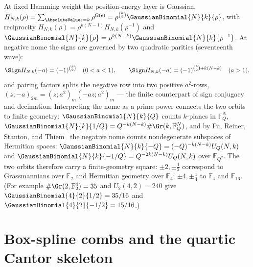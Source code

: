 \documentclass[11pt,oneside]{article}
\numberwithin{equation}{section}
\theoremstyle{definition}
\theoremstyle{remark}
\begin{document}
At fixed Hamming weight the position-energy layer is Gaussian,
$H_{N,k}(\rho)=\sum_{\AbsoluteValue\epsilon=k}\rho^{\Omega(\epsilon)}
=\rho^{\binom k2}\GaussianBinomial{N}{k}{\rho}$, with reciprocity
$H_{N,k}(\rho)=\rho^{k(N-1)}H_{N,k}(\rho^{-1})$ and
$\GaussianBinomial{N}{k}{\rho}=\rho^{k(N-k)}\GaussianBinomial{N}{k}{\rho^{-1}}$.  At negative nome the
signs are governed by two quadratic parities (seventeenth wave):
\begin{equation}\label{p7:eq:H-signs}
 \Sign H_{N,k}(-a)=(-1)^{\binom k2}
 \quad(0<a<1),
 \qquad
 \Sign H_{N,k}(-a)=(-1)^{\binom k2+k(N-k)}
 \quad(a>1),
\end{equation}
and pairing factors splits the negative row into two positive $a^2$-rows,
$(z;-a)_{2m}=(z;a^2)_m(-az;a^2)_m$ --- the finite counterpart of sign
conjugacy and decimation.  Interpreting the nome as a prime power connects
the two orbits to finite geometry: $\GaussianBinomial{N}{k}{Q}$ counts $k$-planes in
$\mathbb F_Q^N$, $\GaussianBinomial{N}{k}{1/Q}=Q^{-k(N-k)}\#\Gr(k,\mathbb F_Q^N)$, and by
Fu, Reiner, Stanton, and Thiem~\cite{p7:fu-reiner-stanton-thiem} the negative
nome counts nondegenerate subspaces of Hermitian spaces:
$\GaussianBinomial{N}{k}{-Q}=(-Q)^{-k(N-k)}U_Q(N,k)$ and
$\GaussianBinomial{N}{k}{-1/Q}=Q^{-2k(N-k)}U_Q(N,k)$ over $\mathbb F_{Q^2}$.  The two
orbits therefore carry a finite-geometry square: $\pm2,\pm\tfrac12$
correspond to Grassmannians over $\mathbb F_2$ and Hermitian geometry over
$\mathbb F_4$; $\pm4,\pm\tfrac14$ to $\mathbb F_4$ and $\mathbb F_{16}$.
(For example $\#\Gr(2,\mathbb F_2^4)=35$ and $U_2(4,2)=240$ give
$\GaussianBinomial{4}{2}{1/2}=35/16$ and $\GaussianBinomial{4}{2}{-1/2}=15/16$.)

\section{Box-spline combs and the quartic Cantor skeleton}
\label{p7:sec:comb}
\end{document}
